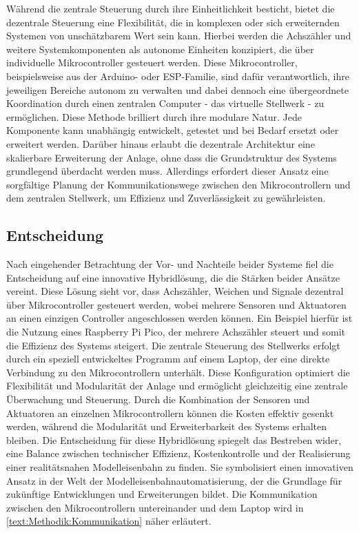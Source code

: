 Während die zentrale Steuerung durch ihre Einheitlichkeit besticht, bietet die dezentrale Steuerung eine Flexibilität, die in komplexen oder sich erweiternden Systemen von unschätzbarem Wert sein kann. Hierbei werden die Achszähler und weitere Systemkomponenten als autonome Einheiten konzipiert, die über individuelle Mikrocontroller gesteuert werden. Diese Mikrocontroller, beispielsweise aus der Arduino- oder ESP-Familie, sind dafür verantwortlich, ihre jeweiligen Bereiche autonom zu verwalten und dabei dennoch eine übergeordnete Koordination durch einen zentralen Computer - das virtuelle Stellwerk - zu ermöglichen.
\newline
Diese Methode brilliert durch ihre modulare Natur. Jede Komponente kann unabhängig entwickelt, getestet und bei Bedarf ersetzt oder erweitert werden. Darüber hinaus erlaubt die dezentrale Architektur eine skalierbare Erweiterung der Anlage, ohne dass die Grundstruktur des Systems grundlegend überdacht werden muss. Allerdings erfordert dieser Ansatz eine sorgfältige Planung der Kommunikationswege zwischen den Mikrocontrollern und dem zentralen Stellwerk, um Effizienz und Zuverlässigkeit zu gewährleisten.

\subsection{Entscheidung}\label{text:Methodik:Systemkonfiguration:Entscheidung}

Nach eingehender Betrachtung der Vor- und Nachteile beider Systeme fiel die Entscheidung auf eine innovative Hybridlösung, die die Stärken beider Ansätze vereint. Diese Lösung sieht vor, dass Achszähler, Weichen und Signale dezentral über Mikrocontroller gesteuert werden, wobei mehrere Sensoren und Aktuatoren an einen einzigen Controller angeschlossen werden können. Ein Beispiel hierfür ist die Nutzung eines Raspberry Pi Pico, der mehrere Achszähler steuert und somit die Effizienz des Systems steigert.
\newline
Die zentrale Steuerung des Stellwerks erfolgt durch ein speziell entwickeltes Programm auf einem Laptop, der eine direkte Verbindung zu den Mikrocontrollern unterhält. Diese Konfiguration optimiert die Flexibilität und Modularität der Anlage und ermöglicht gleichzeitig eine zentrale Überwachung und Steuerung. Durch die Kombination der Sensoren und Aktuatoren an einzelnen Mikrocontrollern können die Kosten effektiv gesenkt werden, während die Modularität und Erweiterbarkeit des Systems erhalten bleiben.
\newline
Die Entscheidung für diese Hybridlösung spiegelt das Bestreben wider, eine Balance zwischen technischer Effizienz, Kostenkontrolle und der Realisierung einer realitätsnahen Modelleisenbahn zu finden. Sie symbolisiert einen innovativen Ansatz in der Welt der Modelleisenbahnautomatisierung, der die Grundlage für zukünftige Entwicklungen und Erweiterungen bildet.
\newline
Die Kommunikation zwischen den Mikrocontrollern untereinander und dem Laptop wird in \autoref{text:Methodik:Kommunikation}  näher erläutert.
